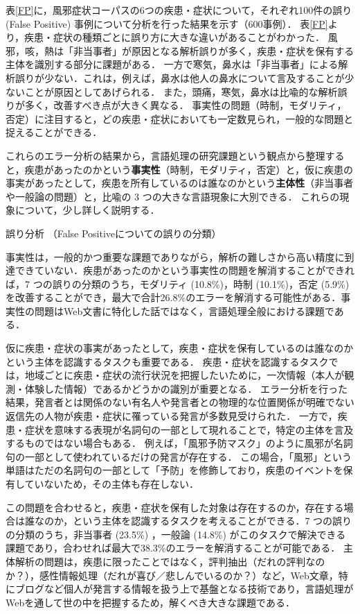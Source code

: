 \documentclass[japanese]{jnlp_1.4}
\begin{document}
表\ref{FP}に，風邪症状コーパスの6つの疾患・症状について，それぞれ100件の誤り (False Positive) 事例について分析を行った結果を示す（600事例）．
表\ref{FP}より，疾患・症状の種類ごとに誤り方に大きな違いがあることがわかった．
風邪，咳，熱は「非当事者」が原因となる解析誤りが多く，疾患・症状を保有する主体を識別する部分に課題がある．
一方で寒気，鼻水は「非当事者」による解析誤りが少ない．これは，例えば，鼻水は他人の鼻水について言及することが少ないことが原因としてあげられる．
また，頭痛，寒気，鼻水は比喩的な解析誤りが多く，改善すべき点が大きく異なる．
事実性の問題（時制，モダリティ，否定）に注目すると，どの疾患・症状においても一定数見られ，一般的な問題と捉えることができる．

これらのエラー分析の結果から，言語処理の研究課題という観点から整理すると，疾患があったのかという\textbf{事実性}（時制，モダリティ，否定）と，仮に疾患の事実があったとして，疾患を所有しているのは誰なのかという\textbf{主体性}（非当事者や一般論の問題）と，比喩の 3 つの大きな言語現象に大別できる．
これらの現象について，少し詳しく説明する．

\begin{table}[t]
\caption{誤り分析 （False Positiveについての誤りの分類）}
\label{FP}

\end{table}

事実性は，一般的かつ重要な課題でありながら，解析の難しさから高い精度に到達できていない\cite{narita2013lexicon,matsuyoshi2010annotating}．疾患があったのかという事実性の問題を解消することができれば，7 つの誤りの分類のうち，モダリティ (10.8\%)，時制 (10.1\%)，否定 (5.9\%) を改善することができ，最大で合計26.8\%のエラーを解消する可能性がある．事実性の問題はWeb文書に特化した話ではなく，言語処理全般における課題である．

仮に疾患・症状の事実があったとして，疾患・症状を保有しているのは誰なのかという主体を認識するタスクも重要である．
疾患・症状を認識するタスクでは，地域ごとに疾患・症状の流行状況を把握したいために，一次情報（本人が観測・体験した情報）であるかどうかの識別が重要となる．
エラー分析を行った結果，発言者とは関係のない有名人や発言者との物理的な位置関係が明確でない返信先の人物が疾患・症状に罹っている発言が多数見受けられた．
一方で，疾患・症状を意味する表現が名詞句の一部として現れることで，特定の主体を言及するものではない場合もある．
例えば，「風邪予防マスク」のように風邪が名詞句の一部として使われているだけの発言が存在する．
この場合，「風邪」という単語はただの名詞句の一部として「予防」を修飾しており，疾患のイベントを保有していないため，その主体も存在しない．

この問題を合わせると，疾患・症状を保有した対象は存在するのか，存在する場合は誰なのか，という主体を認識するタスクを考えることができる．7 つの誤りの分類のうち，非当事者 (23.5\%) ，一般論 (14.8\%) がこのタスクで解決できる課題であり，合わせれば最大で38.3\%のエラーを解消することが可能である．
主体解析の問題は，疾患に限ったことではなく，評判抽出（だれの評判なのか？），感性情報処理（だれが喜び／悲しんでいるのか？）など，Web文章，特にブログなど個人が発言する情報を扱う上で基盤となる技術であり，言語処理がWebを通して世の中を把握するため，解くべき大きな課題である．
\end{document}
